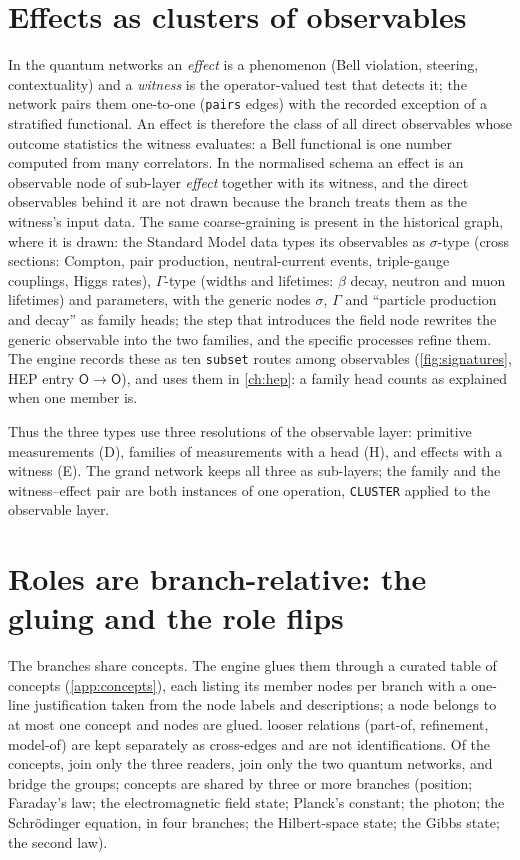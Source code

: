 \documentclass[11pt,a4paper,twoside,openany]{report}
\theoremstyle{plain}
\theoremstyle{definition}
\theoremstyle{remark}
\newcommand{\lay}[1]{\mathsf{#1}}
\newcommand{\id}[1]{\texttt{#1}}
\newcommand{\op}[1]{\texttt{\MakeUppercase{#1}}}
\begin{document}
\section{Effects as clusters of observables}\label{sec:families}
In the quantum networks an \emph{effect} is a phenomenon (Bell violation, steering, contextuality) and a \emph{witness} is the operator-valued test that detects it; the network pairs them one-to-one (\id{pairs} edges) with the recorded exception of a stratified functional. An effect is therefore the class of all direct observables whose outcome statistics the witness evaluates: a Bell functional is one number computed from many correlators. In the normalised schema an effect is an observable node of sub-layer \emph{effect} together with its witness, and the direct observables behind it are not drawn because the branch treats them as the witness's input data. The same coarse-graining is present in the historical graph, where it is drawn: the Standard Model data types its observables as $\sigma$-type (cross sections: Compton, pair production, neutral-current events, triple-gauge couplings, Higgs rates), $\Gamma$-type (widths and lifetimes: $\beta$ decay, neutron and muon lifetimes) and parameters, with the generic nodes $\sigma$, $\Gamma$ and ``particle production and decay'' as family heads; the step that introduces the field node rewrites the generic observable into the two families, and the specific processes refine them. The engine records these as ten \id{subset} routes among observables (\cref{fig:signatures}, HEP entry $\lay O\to\lay O$), and uses them in \cref{ch:hep}: a family head counts as explained when one member is.

Thus the three types use three resolutions of the observable layer: primitive measurements (D), families of measurements with a head (H), and effects with a witness (E). The grand network keeps all three as sub-layers; the family and the witness--effect pair are both instances of one operation, \op{cluster} applied to the observable layer.

\section{Roles are branch-relative: the gluing and the role flips}\label{sec:flips}
The branches share concepts. The engine glues them through a curated table of \NnConcepts{} concepts (\cref{app:concepts}), each listing its member nodes per branch with a one-line justification taken from the node labels and descriptions; a node belongs to at most one concept and \NnGlued{} nodes are glued. \NnCross{} looser relations (part-of, refinement, model-of) are kept separately as cross-edges and are not identifications. Of the \NnConcepts{} concepts, \NnConceptsReaders{} join only the three readers, \NnConceptsQuantumInfo{} join only the two quantum networks, and \NnConceptsBridge{} bridge the groups; \NnConceptsThreePlus{} concepts are shared by three or more branches (position; Faraday's law; the electromagnetic field state; Planck's constant; the photon; the Schr\"odinger equation, in four branches; the Hilbert-space state; the Gibbs state; the second law).
\end{document}
